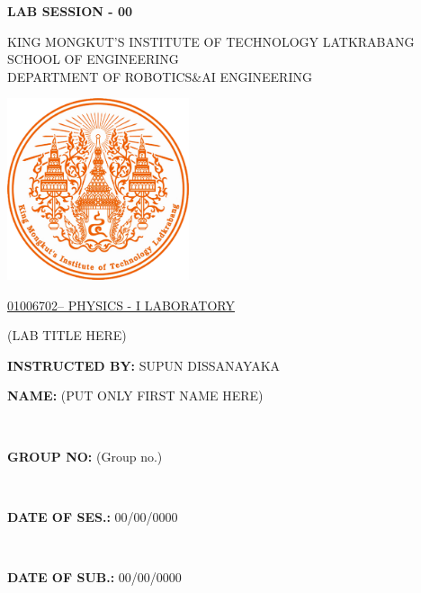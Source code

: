 \documentclass[a4paper,12pt]{article}
\begin{document}
\begin{center}
	\noindent\hfill\textbf{LAB SESSION - 00}  %
	\vspace*{36pt}

	{\fontsize{14}{16}\selectfont
		KING MONGKUT’S INSTITUTE OF TECHNOLOGY LATKRABANG\\
		SCHOOL OF ENGINEERING\\
		DEPARTMENT OF ROBOTICS\&AI ENGINEERING\\
	}

	\vspace{42pt}

	\includegraphics[width=0.4\textwidth]{kmitl_logo.png}\\

	\vspace{56pt}

	{\fontsize{16}{18}\selectfont
		\underline{01006702– PHYSICS - I LABORATORY}\\
	}

	\vspace{32pt}

	\begin{center}
		(LAB TITLE HERE)  %
	\end{center}

	\vspace{60pt}

	\begin{flushleft}
		\textbf{INSTRUCTED BY:} \quad SUPUN DISSANAYAKA
	\end{flushleft}

	\vfill

	\begin{flushright}
		\parbox{8cm}{\textbf{NAME:} (PUT ONLY FIRST NAME HERE)}\\  %
		\parbox{8cm}{\textbf{GROUP NO:} (Group no.)}\\  %
		\parbox{8cm}{\textbf{DATE OF SES.:} 00/00/0000}\\  %
		\parbox{8cm}{\textbf{DATE OF SUB.:} 00/00/0000}  %
	\end{flushright}

	\vspace{36pt}

\end{center}
\end{document}
